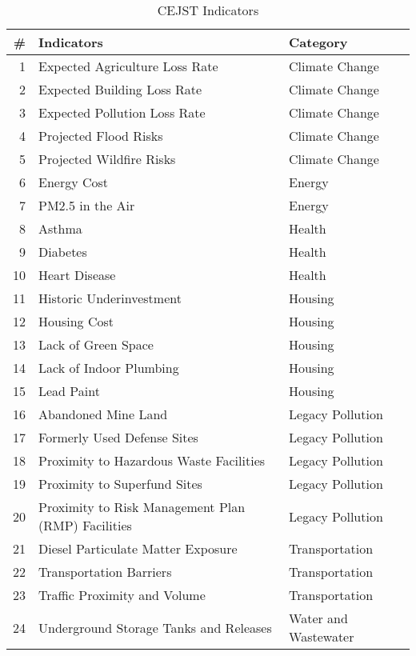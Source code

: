 \documentclass{article}
\begin{document}
\begin{table}[ht]
    \centering
    \caption{CEJST Indicators}
    \begin{tabular}{@{}r l l@{}} %
        \toprule %
        \textbf{\#} & \textbf{Indicators} & \textbf{Category} \\
        \midrule %
        1 & Expected Agriculture Loss Rate & Climate Change \\
        2 & Expected Building Loss Rate & Climate Change \\
        3 & Expected Pollution Loss Rate & Climate Change \\
        4 & Projected Flood Risks & Climate Change \\
        5 & Projected Wildfire Risks & Climate Change\\
        6 & Energy Cost & Energy \\
        7 & PM2.5 in the Air & Energy \\
        8 & Asthma & Health \\
        9 & Diabetes & Health \\
        10 & Heart Disease & Health \\
        11 & Historic Underinvestment & Housing \\
        12 & Housing Cost & Housing \\
        13 & Lack of Green Space & Housing \\
        14 & Lack of Indoor Plumbing & Housing \\
        15 & Lead Paint & Housing \\
        16 & Abandoned Mine Land & Legacy Pollution \\
        17 & Formerly Used Defense Sites & Legacy Pollution \\
        18 & Proximity to Hazardous Waste Facilities & Legacy Pollution \\
        19 & Proximity to Superfund Sites & Legacy Pollution \\
        20 & Proximity to Risk Management Plan (RMP) Facilities & Legacy Pollution \\
        21 & Diesel Particulate Matter Exposure & Transportation \\
        22 & Transportation Barriers & Transportation \\
        23 & Traffic Proximity and Volume & Transportation \\
        24 & Underground Storage Tanks and Releases & Water and Wastewater \\

\end{tabular}
\end{table}
\end{document}
